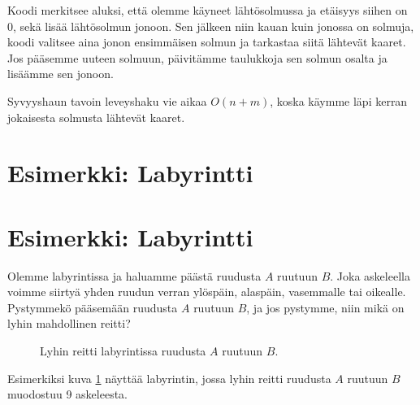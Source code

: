 Koodi merkitsee aluksi, että olemme käyneet lähtösolmussa
ja etäisyys siihen on 0, sekä lisää lähtösolmun jonoon.
Sen jälkeen niin kauan kuin jonossa on solmuja,
koodi valitsee aina jonon ensimmäisen solmun
ja tarkastaa siitä lähtevät kaaret.
Jos pääsemme uuteen solmuun, päivitämme taulukkoja
sen solmun osalta ja lisäämme sen jonoon.

Syvyyshaun tavoin leveyshaku vie aikaa $O(n+m)$,
koska käymme läpi kerran jokaisesta solmusta lähtevät kaaret.

\section{Esimerkki: Labyrintti}

\section{Esimerkki: Labyrintti}

Olemme labyrintissa ja haluamme päästä ruudusta $A$ ruutuun $B$.
Joka askeleella voimme siirtyä yhden ruudun verran ylöspäin, alaspäin,
vasemmalle tai oikealle.
Pystymmekö pääsemään ruudusta $A$ ruutuun $B$, ja jos pystymme, niin
mikä on lyhin mahdollinen reitti?

\begin{figure}
\center
\begin{center}
\end{center}
\caption{Lyhin reitti labyrintissa ruudusta $A$ ruutuun $B$.}
\label{fig:labrei}
\end{figure}

Esimerkiksi kuva \ref{fig:labrei} näyttää labyrintin, jossa lyhin reitti
ruudusta $A$ ruutuun $B$ muodostuu 9 askeleesta.

